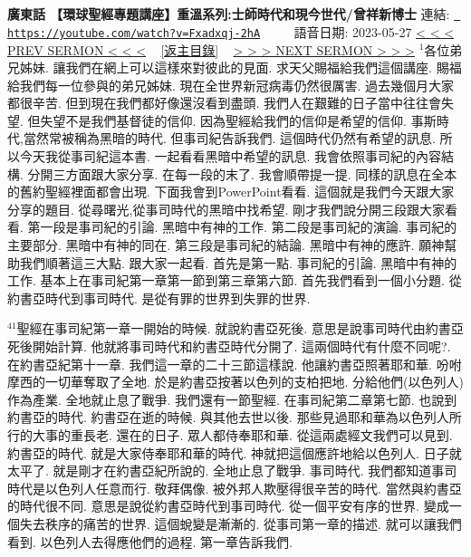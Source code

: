\documentclass{book}
\begin{document}
\section{}
\label{sec:Fxadxqj_2hA}
\textbf{廣東話 【環球聖經專題講座】重溫系列:士師時代和現今世代/曾祥新博士}
\newline
\newline
連結: \href{https://youtube.com/watch?v=Fxadxqj-2hA}{\texttt{ https://youtube.com/watch?v=Fxadxqj-2hA}} ~~~~ 語音日期: 2023-05-27 
\newline
\newline
\hyperref[sec:VHMEb5E_3Qc]{\small{< < < PREV SERMON < < <}}
~
\hyperref[sec:index]{\small{[返主目錄]}}
~
\hyperref[sec:0YlBYq577gM]{\small{> > > NEXT SERMON > > >}}
\newline
\newline
$^{1}$各位弟兄姊妹.
讓我們在網上可以這樣來對彼此的見面.
求天父賜福給我們這個講座.
賜福給我們每一位參與的弟兄姊妹.
現在全世界新冠病毒仍然很厲害.
過去幾個月大家都很辛苦.
但到現在我們都好像還沒看到盡頭.
我們人在艱難的日子當中往往會失望.
但失望不是我們基督徒的信仰.
因為聖經給我們的信仰是希望的信仰.
事斯時代,當然常被稱為黑暗的時代.
但事司紀告訴我們.
這個時代仍然有希望的訊息.
所以今天我從事司紀這本書.
一起看看黑暗中希望的訊息.
我會依照事司紀的內容結構.
分開三方面跟大家分享.
在每一段的末了.
我會順帶提一提.
同樣的訊息在全本的舊約聖經裡面都會出現.
下面我會到PowerPoint看看.
這個就是我們今天跟大家分享的題目.
從尋曙光,從事司時代的黑暗中找希望.
剛才我們說分開三段跟大家看看.
第一段是事司紀的引論.
黑暗中有神的工作.
第二段是事司紀的演論.
事司紀的主要部分.
黑暗中有神的同在.
第三段是事司紀的結論.
黑暗中有神的應許.
願神幫助我們順著這三大點.
跟大家一起看.
首先是第一點.
事司紀的引論.
黑暗中有神的工作.
基本上在事司紀第一章第一節到第三章第六節.
首先我們看到一個小分題.
從約書亞時代到事司時代.
是從有罪的世界到失罪的世界.

$^{41}$聖經在事司紀第一章一開始的時候.
就說約書亞死後.
意思是說事司時代由約書亞死後開始計算.
他就將事司時代和約書亞時代分開了.
這兩個時代有什麼不同呢?.
在約書亞紀第十一章.
我們這一章的二十三節這樣說.
他讓約書亞照著耶和華.
吩咐摩西的一切華奪取了全地.
於是約書亞按著以色列的支柏把地.
分給他們(以色列人)作為產業.
全地就止息了戰爭.
我們還有一節聖經.
在事司紀第二章第七節.
也說到約書亞的時代.
約書亞在逝的時候.
與其他去世以後.
那些見過耶和華為以色列人所行的大事的重長老.
還在的日子.
眾人都侍奉耶和華.
從這兩處經文我們可以見到.
約書亞的時代.
就是大家侍奉耶和華的時代.
神就把這個應許地給以色列人.
日子就太平了.
就是剛才在約書亞紀所說的.
全地止息了戰爭.
事司時代.
我們都知道事司時代是以色列人任意而行.
敬拜偶像.
被外邦人欺壓得很辛苦的時代.
當然與約書亞的時代很不同.
意思是說從約書亞時代到事司時代.
從一個平安有序的世界.
變成一個失去秩序的痛苦的世界.
這個蛻變是漸漸的.
從事司第一章的描述.
就可以讓我們看到.
以色列人去得應他們的過程.
第一章告訴我們.
\end{document}

